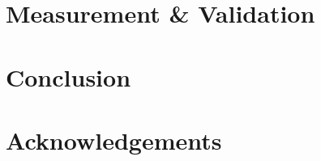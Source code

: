 \documentclass[conference]{../../resources/IEEEtran/IEEEtran}
\begin{document}

\section{Measurement \& Validation}
\label{sec:valid}



\section{Conclusion}
\label{sec:conclusion}



\section{Acknowledgements}
\label{sec:ack}












\end{document}
